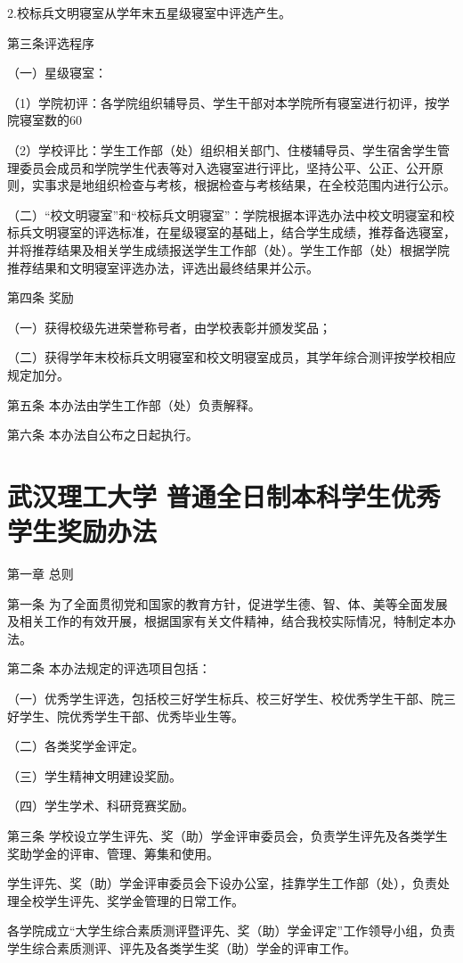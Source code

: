 \documentclass[UTF8,12pt,a4paper]{report}
\begin{document}
2.校标兵文明寝室从学年末五星级寝室中评选产生。

第三条评选程序

（一）星级寝室：

（1）学院初评：各学院组织辅导员、学生干部对本学院所有寝室进行初评，按学院寝室数的60%

（2）学校评比：学生工作部（处）组织相关部门、住楼辅导员、学生宿舍学生管理委员会成员和学院学生代表等对入选寝室进行评比，坚持公平、公正、公开原则，实事求是地组织检查与考核，根据检查与考核结果，在全校范围内进行公示。

（二）“校文明寝室”和“校标兵文明寝室”：学院根据本评选办法中校文明寝室和校标兵文明寝室的评选标准，在星级寝室的基础上，结合学生成绩，推荐备选寝室，并将推荐结果及相关学生成绩报送学生工作部（处）。学生工作部（处）根据学院推荐结果和文明寝室评选办法，评选出最终结果并公示。

第四条 奖励

（一）获得校级先进荣誉称号者，由学校表彰并颁发奖品；

（二）获得学年末校标兵文明寝室和校文明寝室成员，其学年综合测评按学校相应规定加分。

第五条 本办法由学生工作部（处）负责解释。

第六条 本办法自公布之日起执行。

\chapter{武汉理工大学 普通全日制本科学生优秀学生奖励办法}
第一章  总则

第一条  为了全面贯彻党和国家的教育方针，促进学生德、智、体、美等全面发展及相关工作的有效开展，根据国家有关文件精神，结合我校实际情况，特制定本办法。

第二条  本办法规定的评选项目包括：

（一）优秀学生评选，包括校三好学生标兵、校三好学生、校优秀学生干部、院三好学生、院优秀学生干部、优秀毕业生等。

（二）各类奖学金评定。

（三）学生精神文明建设奖励。

（四）学生学术、科研竞赛奖励。

第三条  学校设立学生评先、奖（助）学金评审委员会，负责学生评先及各类学生奖助学金的评审、管理、筹集和使用。

学生评先、奖（助）学金评审委员会下设办公室，挂靠学生工作部（处），负责处理全校学生评先、奖学金管理的日常工作。

各学院成立“大学生综合素质测评暨评先、奖（助）学金评定”工作领导小组，负责学生综合素质测评、评先及各类学生奖（助）学金的评审工作。
\end{document}
